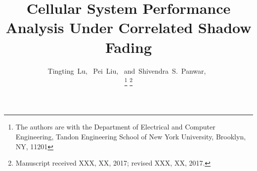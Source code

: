 \documentclass[journal,10pt]{IEEEtran}
\begin{document}

\title{Cellular System Performance Analysis Under Correlated Shadow Fading}


\author{Tingting~Lu,~
        Pei~Liu,~
        and~Shivendra~S.~Panwar,~%

\thanks{The authors are with the Department of Electrical and Computer Engineering, Tandon Engineering School of New York University, Brooklyn, NY, 11201}%
\thanks{Manuscript received XXX, XX, 2017; revised XXX, XX, 2017.}}

{}
\end{document}

